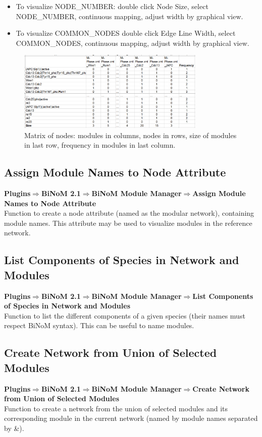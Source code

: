 \begin{itemize}
\item To visualize NODE\_NUMBER: double click Node Size, select NODE\_NUMBER, continuous mapping, adjust width by graphical view.
\item To visualize COMMON\_NODES double click Edge Line Width, select COMMON\_NODES, continuous mapping, adjust width by graphical view.
\end{itemize}
\begin{figure}
\centering
\includegraphics[width=0.8\textwidth]{graphics/Common_nodes_in_modules}
\caption{Matrix of nodes: modules in columns, nodes in rows, size of modules in last row, frequency in modules in last column.}
\label{Common_nodes_in_modules}
\end{figure}

\subsection{Assign Module Names to Node Attribute}
\textbf{Plugins$\Rightarrow$BiNoM 2.1$\Rightarrow$BiNoM Module Manager$\Rightarrow$Assign Module Names to Node Attribute}\\
Function to create a node attribute (named as the modular network), containing module names. This attribute may be used to visualize modules in the reference network.

\subsection{List Components of Species in Network and Modules}
\textbf{Plugins$\Rightarrow$BiNoM 2.1$\Rightarrow$BiNoM Module Manager$\Rightarrow$List Components of Species in Network and Modules}\\
Function to list the different components of a given species (their names must respect BiNoM syntax). This can be useful to name modules.

\subsection{Create Network from Union of Selected Modules}
\textbf{Plugins$\Rightarrow$BiNoM 2.1$\Rightarrow$BiNoM Module Manager$\Rightarrow$Create Network from Union of Selected Modules}\\
Function to create a network from the union of selected modules and its corresponding module in the current network (named by module names separated by \&).

